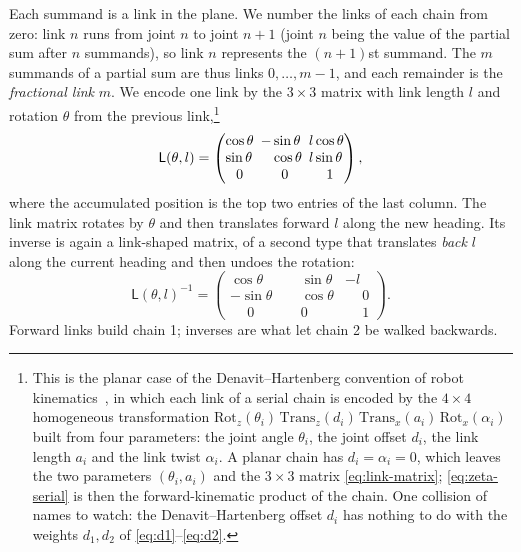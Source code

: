 \documentclass[11pt]{article}
\makeatletter
\theoremstyle{definition}
\newcommand{\linkmat}[2]{%
\left(\begin{array}{@{}l@{\ \,}l@{\ \,}l@{}}
\cos #1 & -\sin #1           & #2\cos #1\\
\sin #1 & \phantom{-}\cos #1 & #2\sin #1\\
\multicolumn{1}{@{}c@{\ \,}}{0} & \multicolumn{1}{c@{\ \,}}{0} & \multicolumn{1}{c@{}}{1}
\end{array}\right)}
\makeatother
\begin{document}
Each summand is a link in the plane. We number the
links of each chain from zero: link $n$ runs from joint $n$ to joint $n+1$
(joint $n$ being the value of the partial sum after $n$ summands), so link $n$
represents the $(n+1)$st summand. The $m$ summands of a partial sum are thus
links $0,\dots,m-1$, and each remainder is the \emph{fractional link} $m$. We
encode one link by the $3\times3$ matrix with link length $l$ and rotation
$\theta$ from the previous link,\footnote{This is the planar case of the
Denavit--Hartenberg convention of robot kinematics~\cite{DenavitHartenberg1955},
in which each link of a serial chain is encoded by the $4\times4$ homogeneous
transformation
$\mathrm{Rot}_z(\theta_i)\,\mathrm{Trans}_z(d_i)\,\mathrm{Trans}_x(a_i)\,
\mathrm{Rot}_x(\alpha_i)$
built from four parameters: the joint angle $\theta_i$, the joint offset $d_i$,
the link length $a_i$ and the link twist $\alpha_i$. A planar chain has
$d_i=\alpha_i=0$, which leaves the two parameters $(\theta_i,a_i)$ and the
$3\times3$ matrix \eqref{eq:link-matrix}; \eqref{eq:zeta-serial} is then the
forward-kinematic product of the chain. One collision of names to watch: the
Denavit--Hartenberg offset $d_i$ has nothing to do with the weights $d_1,d_2$ of
\eqref{eq:d1}--\eqref{eq:d2}.}
\begin{equation}\label{eq:link-matrix}
\mathsf L(\theta,l)=\linkmat{\theta}{l},
\end{equation}
where the accumulated position is the top two entries of the last column.
The link matrix rotates by $\theta$ and then translates forward $l$
along the new heading. Its inverse is again a link-shaped matrix, of a
second type that translates \emph{back} $l$ along the current heading and
then undoes the rotation:
\begin{equation}\label{eq:link-matrix-2}
\mathsf L(\theta,l)^{-1}=
\begin{pmatrix}
\cos\theta & \phantom{-}\sin\theta & -l\\
-\sin\theta & \phantom{-}\cos\theta & \phantom{-}0\\
\phantom{-}0 & \phantom{-}0 & \phantom{-}1
\end{pmatrix}.
\end{equation}
Forward links build chain 1; inverses are what let chain 2 be walked
backwards.
\end{document}
